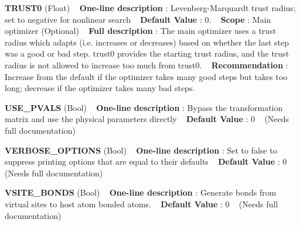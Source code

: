 \begin{DoxyItemize}
\item {\bfseries  T\+R\+U\+S\+T0 } (Float) ~\newline
{\bfseries  One-\/line description }\+: Levenberg-\/\+Marquardt trust radius; set to negative for nonlinear search ~\newline
{\bfseries  Default Value }\+: 0. ~\newline
{\bfseries  Scope }\+: Main optimizer (Optional) ~\newline
{\bfseries  Full description }\+: The main optimizer uses a trust radius which \textquotesingle{}adapts\textquotesingle{} (i.\+e. increases or decreases) based on whether the last step was a good or bad step. \textquotesingle{}trust0\textquotesingle{} provides the starting trust radius, and the trust radius is not allowed to increase too much from trust0. ~\newline
{\bfseries  Recommendation }\+: Increase from the default if the optimizer takes many good steps but takes too long; decrease if the optimizer takes many bad steps.\end{DoxyItemize}
\begin{DoxyItemize}
\item {\bfseries  U\+S\+E\+\_\+\+P\+V\+A\+LS } (Bool) ~\newline
{\bfseries  One-\/line description }\+: Bypass the transformation matrix and use the physical parameters directly ~\newline
{\bfseries  Default Value }\+: 0 ~\newline
(Needs full documentation)\end{DoxyItemize}
\begin{DoxyItemize}
\item {\bfseries  V\+E\+R\+B\+O\+S\+E\+\_\+\+O\+P\+T\+I\+O\+NS } (Bool) ~\newline
{\bfseries  One-\/line description }\+: Set to false to suppress printing options that are equal to their defaults ~\newline
{\bfseries  Default Value }\+: 0 ~\newline
(Needs full documentation)\end{DoxyItemize}
\begin{DoxyItemize}
\item {\bfseries  V\+S\+I\+T\+E\+\_\+\+B\+O\+N\+DS } (Bool) ~\newline
{\bfseries  One-\/line description }\+: Generate bonds from virtual sites to host atom bonded atoms. ~\newline
{\bfseries  Default Value }\+: 0 ~\newline
(Needs full documentation)\end{DoxyItemize}
